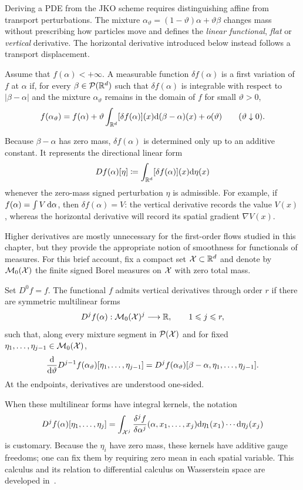 Deriving a PDE from the JKO scheme requires distinguishing affine from transport perturbations. The mixture \(\alpha_\vartheta=(1-\vartheta)\alpha+\vartheta\beta\) changes mass without prescribing how particles move and defines the \emph{linear functional}, \emph{flat} or \emph{vertical} derivative. The horizontal derivative introduced below instead follows a transport displacement.
\begin{defn}\label{def-first-variation}
	Assume that \(f(\alpha)<+\infty\). A measurable function \(\delta f(\alpha)\) is a first variation of \(f\) at \(\alpha\) if, for every \(\beta\in\mathcal{P}(\mathbb{R}^d)\) such that \(\delta f(\alpha)\) is integrable with respect to \(\lvert\beta-\alpha\rvert\) and the mixture \(\alpha_\vartheta\) remains in the domain of \(f\) for small \(\vartheta>0\),
	\[
		f(\alpha_\vartheta)
		=
		f(\alpha)
		+\vartheta\int_{\mathbb{R}^d}[\delta f(\alpha)](x)
		\mathrm{d}(\beta-\alpha)(x)
		+o(\vartheta)
		\qquad(\vartheta\downarrow0).
	\]
\end{defn}
Because \(\beta-\alpha\) has zero mass, \(\delta f(\alpha)\) is determined only up to an additive constant. It represents the directional linear form
\[
	Df(\alpha)[\eta]
	\coloneqq
	\int_{\mathbb{R}^d}[\delta f(\alpha)](x)\mathrm{d}\eta(x)
\]
whenever the zero-mass signed perturbation \(\eta\) is admissible. For example, if \(f(\alpha)=\int V\,\mathrm{d}\alpha\), then \(\delta f(\alpha)=V\): the vertical derivative records the value \(V(x)\), whereas the horizontal derivative will record its spatial gradient \(\nabla V(x)\).

Higher derivatives are mostly unnecessary for the first-order flows studied in this chapter, but they provide the appropriate notion of smoothness for functionals of measures. For this brief account, fix a compact set \(\mathcal{X}\subset\mathbb{R}^d\) and denote by \(\mathcal{M}_0(\mathcal{X})\) the finite signed Borel measures on \(\mathcal{X}\) with zero total mass.
\begin{defn}\label{def-higher-order-vertical-derivatives}
	Set \(D^0f=f\). The functional \(f\) admits vertical derivatives through order \(r\) if there are symmetric multilinear forms
	\[
		D^j f(\alpha):\mathcal{M}_0(\mathcal{X})^j\longrightarrow\mathbb{R},
		\qquad 1\leqslant j\leqslant r,
	\]
	such that, along every mixture segment in \(\mathcal{P}(\mathcal{X})\) and for fixed \(\eta_1,\ldots,\eta_{j-1}\in\mathcal{M}_0(\mathcal{X})\),
	\[
		\frac{\mathrm{d}}{\mathrm{d}\vartheta}
		D^{j-1}f(\alpha_\vartheta)[\eta_1,\ldots,\eta_{j-1}]
		=
		D^j f(\alpha_\vartheta)
		[\beta-\alpha,\eta_1,\ldots,\eta_{j-1}].
	\]
	At the endpoints, derivatives are understood one-sided.
\end{defn}
When these multilinear forms have integral kernels, the notation
\[
	D^j f(\alpha)[\eta_1,\ldots,\eta_j]
	=
	\int_{\mathcal{X}^j}
	\frac{\delta^j f}{\delta\alpha^j}
	(\alpha,x_1,\ldots,x_j)
	\mathrm{d}\eta_1(x_1)\cdots\mathrm{d}\eta_j(x_j)
\]
is customary. Because the \(\eta_i\) have zero mass, these kernels have additive gauge freedoms; one can fix them by requiring zero mean in each spatial variable. This calculus and its relation to differential calculus on Wasserstein space are developed in~\cite{CarmonaDelarue2018,ChassagneuxSzpruchTse2022}.

